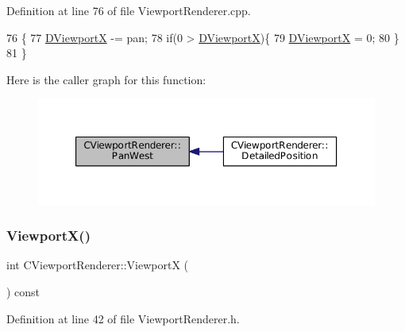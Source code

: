 Definition at line 76 of file Viewport\+Renderer.\+cpp.


\begin{DoxyCode}
76                                       \{
77     \hyperlink{classCViewportRenderer_aea9e05347f71a8e6b83439aab653be18}{DViewportX} -= pan;
78     \textcolor{keywordflow}{if}(0 > \hyperlink{classCViewportRenderer_aea9e05347f71a8e6b83439aab653be18}{DViewportX})\{
79         \hyperlink{classCViewportRenderer_aea9e05347f71a8e6b83439aab653be18}{DViewportX} = 0;
80     \}
81 \}
\end{DoxyCode}
Here is the caller graph for this function\+:\nopagebreak
\begin{figure}[H]
\begin{center}
\leavevmode
\includegraphics[width=350pt]{classCViewportRenderer_aa09c1b984311f77ea1cdcdc74a7a0316_icgraph}
\end{center}
\end{figure}
\hypertarget{classCViewportRenderer_adf6c09ee00cdbf0803e72d59bff9a235}{}\label{classCViewportRenderer_adf6c09ee00cdbf0803e72d59bff9a235} 
\subsubsection{\texorpdfstring{Viewport\+X()}{ViewportX()}\hspace{0.1cm}{\footnotesize\ttfamily [1/2]}}
{\footnotesize\ttfamily int C\+Viewport\+Renderer\+::\+ViewportX (\begin{DoxyParamCaption}{ }\end{DoxyParamCaption}) const\hspace{0.3cm}{\ttfamily [inline]}}



Definition at line 42 of file Viewport\+Renderer.\+h.


